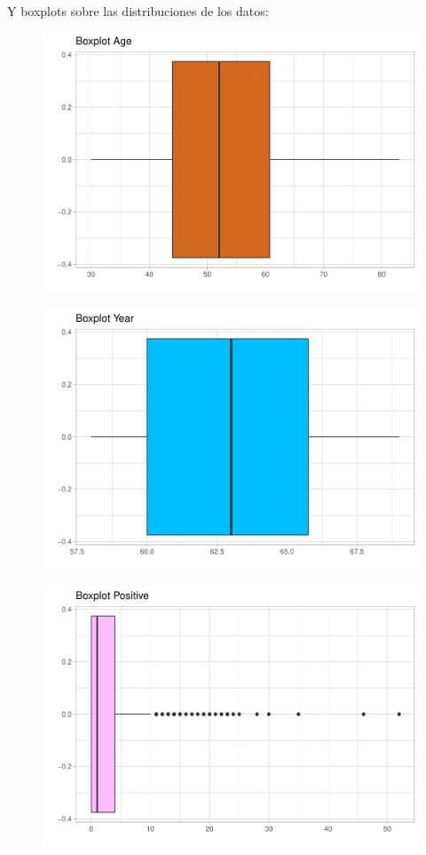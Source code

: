\newpage

Y boxplots sobre las distribuciones de los datos:
\begin{figure}[H]\includegraphics[width=.9\linewidth]{img/EDA2_files/figure-latex/unnamed-chunk-11-1} \end{figure}

\begin{figure}[H]\includegraphics[width=.9\linewidth]{img/EDA2_files/figure-latex/unnamed-chunk-11-2} \end{figure}

\begin{figure}[H]\includegraphics[width=.9\linewidth]{img/EDA2_files/figure-latex/unnamed-chunk-11-3} \end{figure}

